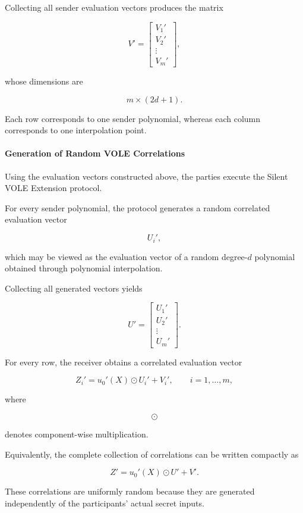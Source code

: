 \documentclass[11pt,a4paper]{article}
\begin{document}
Collecting all sender evaluation vectors produces the matrix

\[
V'
=
\begin{bmatrix}
V_1'\\
V_2'\\
\vdots\\
V_m'
\end{bmatrix},
\]

whose dimensions are

\[
m\times(2d+1).
\]

Each row corresponds to one sender polynomial, whereas each column corresponds to one interpolation point.

 

\paragraph{Generation of Random VOLE Correlations}

Using the evaluation vectors constructed above, the parties execute the Silent VOLE Extension protocol.

For every sender polynomial, the protocol generates a random correlated evaluation vector

\[
U_i',
\]

which may be viewed as the evaluation vector of a random degree-$d$ polynomial obtained through polynomial
interpolation.

Collecting all generated vectors yields

\[
U'
=
\begin{bmatrix}
U_1'\\
U_2'\\
\vdots\\
U_m'
\end{bmatrix}.
\]

For every row, the receiver obtains a correlated evaluation vector

\[
Z_i'
=
u_0'(X)\odot U_i'
+
V_i',
\qquad
i=1,\ldots,m,
\]

where

\[
\odot
\]

denotes component-wise multiplication.

Equivalently, the complete collection of correlations can be written compactly as

\[
Z'
=
u_0'(X)\odot U'
+
V'.
\]

These correlations are uniformly random because they are generated independently of the participants'
actual secret inputs.
\end{document}
